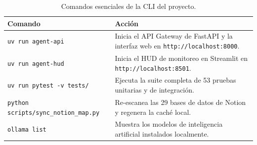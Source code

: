 \documentclass[11pt,a4paper]{article}
\begin{document}
\begin{table}[!htbp]
\centering
\caption{Comandos esenciales de la CLI del proyecto.}
\label{tab:cli_commands}
\begin{tabularx}{\textwidth}{@{}lX@{}}
\toprule
\textbf{Comando} & \textbf{Acción} \\ \midrule
\texttt{uv run agent-api} & Inicia el API Gateway de FastAPI y la interfaz web en \texttt{http://localhost:8000}. \\
\texttt{uv run agent-hud} & Inicia el HUD de monitoreo en Streamlit en \texttt{http://localhost:8501}. \\
\texttt{uv run pytest -v tests/} & Ejecuta la suite completa de 53 pruebas unitarias y de integración. \\
\texttt{python scripts/sync\_notion\_map.py} & Re-escanea las 29 bases de datos de Notion y regenera la caché local. \\
\texttt{ollama list} & Muestra los modelos de inteligencia artificial instalados localmente. \\ \bottomrule
\end{tabularx}
\end{table}
\end{document}
